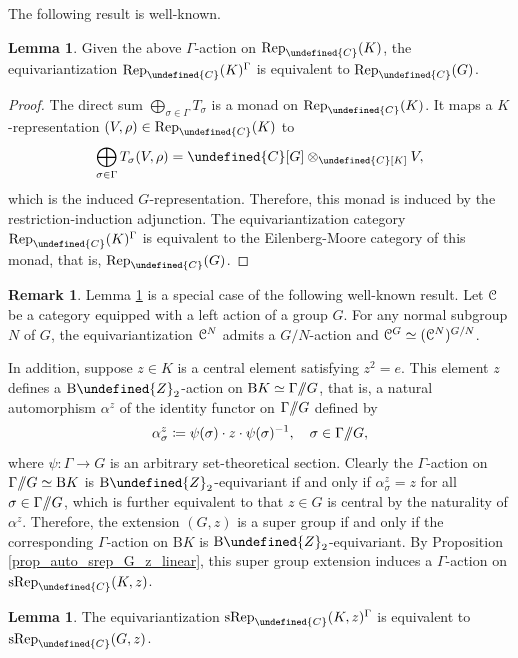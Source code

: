 \documentclass[10pt]{article}
\let\mathbb\undefined
\theoremstyle{definition}
\newtheorem{lem}[thm]{Lemma}
\newtheorem{rem}[thm]{Remark}
\numberwithin{equation}{section}
\numberwithin{thm}{section}
\newcommand{\pf}{\begin{proof}}
\newcommand{\epf}{\end{proof}}
\newcommand{\Cb}{\mathbb{C}}
\newcommand{\Zb}{\mathbb{Z}}
\newcommand{\CC}{\EuScript{C}}
\newcommand{\rmB}{\mathrm{B}}
\newcommand{\rep}{\mathrm{Rep}}
\newcommand{\srep}{\mathrm{sRep}}
\newcommand{\dquotient}{/\mkern-6mu/}
\begin{document}
The following result is well-known.

\begin{lem} \label{lem_extension_action_equivariantization_bosonic_linear}
Given the above $\Gamma$-action on $\rep_\Cb(K)$, the equivariantization $\rep_\Cb(K)^\Gamma$ is equivalent to $\rep_\Cb(G)$.
\end{lem}

\pf
The direct sum $\bigoplus_{\sigma \in \Gamma} T_\sigma$ is a monad on $\rep_\Cb(K)$. It maps a $K$-representation $(V,\rho) \in \rep_\Cb(K)$ to
\[
\bigoplus_{\sigma \in \Gamma} T_\sigma(V,\rho) = \Cb[G] \otimes_{\Cb[K]} V ,
\]
which is the induced $G$-representation. Therefore, this monad is induced by the restriction-induction adjunction. The equivariantization category $\rep_\Cb(K)^\Gamma$ is equivalent to the Eilenberg-Moore category of this monad, that is, $\rep_\Cb(G)$.
\epf

\begin{rem}
Lemma \ref{lem_extension_action_equivariantization_bosonic_linear} is a special case of the following well-known result. Let $\CC$ be a category equipped with a left action of a group $G$. For any normal subgroup $N$ of $G$, the equivariantization $\CC^N$ admits a $G/N$-action and $\CC^G \simeq (\CC^N)^{G/N}$. 
\end{rem}

In addition, suppose $z \in K$ is a central element satisfying $z^2 = e$. This element $z$ defines a $\rmB \Zb_2$-action on $\rmB K \simeq \Gamma \dquotient G$, that is, a natural automorphism $\alpha^z$ of the identity functor on $\Gamma \dquotient G$ defined by
\[
\alpha^z_\sigma \coloneqq \psi(\sigma) \cdot z \cdot \psi(\sigma)^{-1} , \quad \sigma \in \Gamma \dquotient G ,
\]
where $\psi \colon \Gamma \to G$ is an arbitrary set-theoretical section. Clearly the $\Gamma$-action on $\Gamma \dquotient G \simeq \rmB K$ is $\rmB \Zb_2$-equivariant if and only if $\alpha^z_\sigma = z$ for all $\sigma \in \Gamma \dquotient G$, which is further equivalent to that $z \in G$ is central by the naturality of $\alpha^z$. Therefore, the extension $(G,z)$ is a super group if and only if the corresponding $\Gamma$-action on $\rmB K$ is $\rmB \Zb_2$-equivariant. By Proposition \ref{prop_auto_srep_G_z_linear}, this super group extension induces a $\Gamma$-action on $\srep_\Cb(K,z)$.

\begin{lem}
The equivariantization $\srep_\Cb(K,z)^\Gamma$ is equivalent to $\srep_\Cb(G,z)$.
\end{lem}
\end{document}
